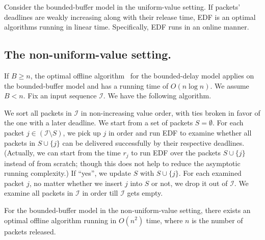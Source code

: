 \documentclass[final, 11pt]{article}
\begin{document}
\begin{corollary}
Consider the bounded-buffer model in the uniform-value setting. If packets' deadlines are weakly increasing along with their release time, EDF is an optimal algorithms running in linear time. Specifically, EDF runs in an online manner.
\end{corollary}


\subsection{The non-uniform-value setting.}

If $B \ge n$, the optimal offline algorithm~\cite{KLMPSS04} for the bounded-delay model applies on the bounded-buffer model and has a running time of $O(n \log n)$. We assume $B < n$. Fix an input sequence $\mathcal I$. We have the following algorithm.

\begin{algorithm}
We sort all packets in $\mathcal I$ in non-increasing value order, with ties broken in favor of the one with a later deadline. We start from a set of packets $S = \emptyset$. For each packet $j \in ({\mathcal I} \setminus S)$, we pick up $j$ in order and run EDF to examine whether all packets in $S \cup \{j\}$ can be delivered successfully by their respective deadlines. (Actually, we can start from the time $r_j$ to run EDF over the packets $S \cup \{j\}$ instead of from scratch; though this does not help to reduce the asymptotic running complexity.) If ``yes'', we update $S$ with $S \cup \{j\}$. For each examined packet $j$, no matter whether we insert $j$ into $S$ or not, we drop it out of $\mathcal I$. We examine all packets in $\mathcal I$ in order till $\mathcal I$ gets empty.
\label{alg:singlenon}
\end{algorithm}

\begin{Lemma}
For the bounded-buffer model in the non-uniform-value setting, there exists an optimal offline algorithm running in $O(n^2)$ time, where $n$ is the number of packets released.
\label{lemma:singleoff2}
\end{Lemma}
\end{document}
